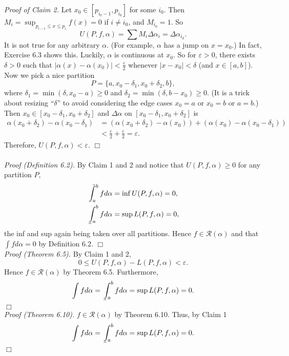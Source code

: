 \documentclass{article}
\def\upint{\mathchoice%
    {\mkern13mu\overline{\vphantom{\intop}\mkern7mu}\mkern-20mu}%
    {\mkern7mu\overline{\vphantom{\intop}\mkern7mu}\mkern-14mu}%
    {\mkern7mu\overline{\vphantom{\intop}\mkern7mu}\mkern-14mu}%
    {\mkern7mu\overline{\vphantom{\intop}\mkern7mu}\mkern-14mu}%
  \int}
\def\lowint{\mkern3mu\underline{\vphantom{\intop}\mkern7mu}\mkern-10mu\int}
\begin{document}
\emph{Proof of Claim 2.}
Let $x_0 \in [p_{i_0 - 1}, p_{i_0}]$ for some $i_0$. Then
$M_i = \sup_{p_{i - 1} \leq x \leq p_i} f(x) = 0$ if $i \neq i_0$, and $M_{i_0} = 1$.
So
$$U(P, f, \alpha) = \sum M_i \Delta \alpha_i = \Delta \alpha_{i_0}.$$
It is not true for any arbitrary $\alpha$. (For example, $\alpha$ has a jump on $x = x_0$.)
In fact, Exercise 6.3 shows this.
Luckily, $\alpha$ is continuous at $x_0$. So for $\varepsilon > 0$,
there exists $\delta > 0$ such that $|\alpha(x) - \alpha(x_0)| < \frac{\varepsilon}{2}$
whenever $|x - x_0| < \delta$ (and $x \in [a, b]$).
Now we pick a nice partition
$$P = \{ a, x_0 - \delta_1, x_0 + \delta_2, b \},$$
where $\delta_1 = \min(\delta, x_0 - a) \geq 0$
and $\delta_2 = \min(\delta, b - x_0) \geq 0$.
(It is a trick about resizing ``$\delta$''
to avoid considering the edge cases $x_0 = a$ or $x_0 = b$ or $a = b$.)
Then $x_0 \in [x_0 - \delta_1, x_0 + \delta_2]$
and $\Delta \alpha$ on $[x_0 - \delta_1, x_0 + \delta_2]$ is
\begin{align*}
\alpha(x_0 + \delta_2) - \alpha(x_0 - \delta_1)
&= (\alpha(x_0 + \delta_2) - \alpha(x_0)) + (\alpha(x_0) - \alpha(x_0 - \delta_1)) \\
&< \frac{\varepsilon}{2} + \frac{\varepsilon}{2} = \varepsilon.
\end{align*}
Therefore, $U(P, f, \alpha) < \varepsilon$.
$\Box$ \\\\



\emph{Proof (Definition 6.2).}
By Claim 1 and 2 and notice that $U(P, f, \alpha) \geq 0$ for any partition $P$,
\begin{align*}
\upint_a^b f d\alpha &= \inf U(P, f, \alpha) = 0, \\
\lowint_a^b f d\alpha &= \sup L(P, f, \alpha) = 0,
\end{align*}
the inf and sup again being taken over all partitions.
Hence $f \in \mathscr{R}(\alpha)$ and that $\int f d \alpha = 0$ by Definition 6.2.
$\Box$ \\

\emph{Proof (Theorem 6.5).}
By Claim 1 and 2,
$$0 \leq U(P, f, \alpha) - L(P, f, \alpha) < \varepsilon.$$
Hence $f \in \mathscr{R}(\alpha)$ by Theorem 6.5.
Furthermore,
$$\int f d \alpha = \lowint_a^b f d\alpha = \sup L(P, f, \alpha) = 0.$$
$\Box$ \\

\emph{Proof (Theorem 6.10).}
$f \in \mathscr{R}(\alpha)$ by Theorem 6.10.
Thus, by Claim 1
$$\int f d \alpha = \lowint_a^b f d\alpha = \sup L(P, f, \alpha) = 0.$$
$\Box$ \\\\
\end{document}
